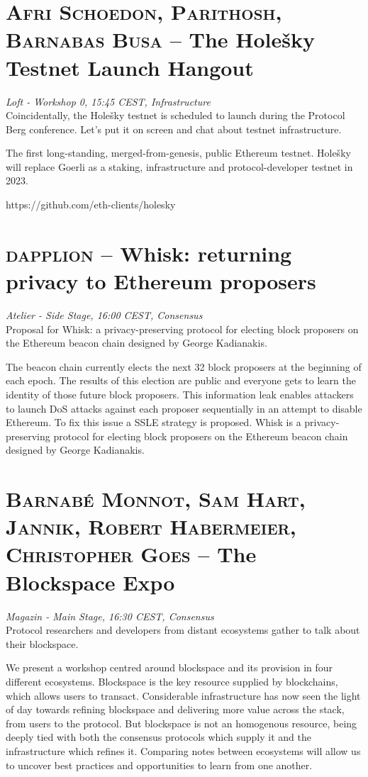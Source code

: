 \section {\textsc{Afri Schoedon, Parithosh, Barnabas Busa} -- The Holešky Testnet Launch Hangout
} \noindent \textit {Loft - Workshop 0, 15:45 CEST, Infrastructure
}\\[1em] Coincidentally, the Holešky testnet is scheduled to launch during the Protocol Berg conference. Let's put it on screen and chat about testnet infrastructure.
\par The first long-standing, merged-from-genesis, public Ethereum testnet. Holešky will replace Goerli as a staking, infrastructure and protocol-developer testnet in 2023.

https://github.com/eth-clients/holesky
\clearpage
\section {\textsc{dapplion} -- Whisk: returning privacy to Ethereum proposers
} \noindent \textit {Atelier - Side Stage, 16:00 CEST, Consensus
}\\[1em] Proposal for Whisk: a privacy-preserving protocol for electing block proposers on the Ethereum beacon chain designed by George Kadianakis.
\par The beacon chain currently elects the next 32 block proposers at the beginning of each epoch. The results of this election are public and everyone gets to learn the identity of those future block proposers. This information leak enables attackers to launch DoS attacks against each proposer sequentially in an attempt to disable Ethereum. To fix this issue a SSLE strategy is proposed. Whisk is a privacy-preserving protocol for electing block proposers on the Ethereum beacon chain designed by George Kadianakis.
\clearpage
\section {\textsc{Barnabé Monnot, Sam Hart, Jannik, Robert Habermeier, Christopher Goes} -- The Blockspace Expo
} \noindent \textit {Magazin - Main Stage, 16:30 CEST, Consensus
}\\[1em] Protocol researchers and developers from distant ecosystems gather to talk about their blockspace.
\par We present a workshop centred around blockspace and its provision in four different ecosystems. Blockspace is the key resource supplied by blockchains, which allows users to transact. Considerable infrastructure has now seen the light of day towards refining blockspace and delivering more value across the stack, from users to the protocol. But blockspace is not an homogenous resource, being deeply tied with both the consensus protocols which supply it and the infrastructure which refines it. Comparing notes between ecosystems will allow us to uncover best practices and opportunities to learn from one another.

